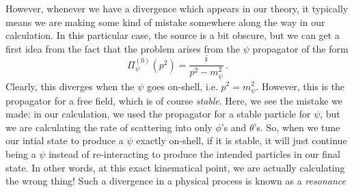 \documentclass{article}
\numberwithin{equation}{subsection}
\begin{document}
However, whenever we have a divergence which appears in our theory, it typically means we are making some kind of mistake
somewhere along the way in our calculation. In this particular case, the source is a bit obscure, but we can get a first idea
from the fact that the problem arises from the $\psi$ propagator of the form
\begin{equation}
 \Pi_\psi^{(0)}(p^2) = \frac{i}{p^2 - m_\psi^2}\,.
\end{equation}
Clearly, this diverges when the $\psi$ goes on-shell, i.e. $p^2 = m_\psi^2$. However, this is the propagator for a free field,
which is of course \textit{stable}. Here, we see the mistake we made: in our calculation, we used the propagator for a stable
particle for $\psi$, but we are calculating the rate of scattering into only $\phi$'s and $\theta$'s. So, when we tune our intial
state to produce a $\psi$ exactly on-shell, if it is stable, it will just continue being a $\psi$ instead of re-interacting to 
produce the intended particles in our final state. In other words, at this exact kinematical point, we are actually calculating the
wrong thing! Such a divergence in a physical process is known as a \textit{resonance}
\end{document}
